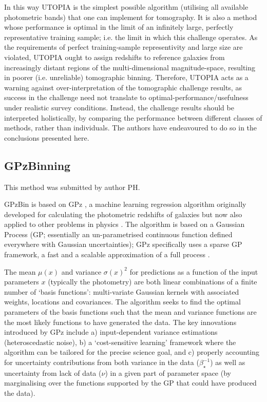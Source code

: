 \documentclass[twocolumn,twocolappendix]{aastex63}
\begin{document}
In this way \textsc{UTOPIA} is the simplest possible algorithm (utilising all available
photometric bands) that one can  implement for tomography. It is also a method
whose performance is optimal in the limit of an infinitely large,  perfectly
representative training sample; i.e. the limit in which this challenge operates.
As the requirements of perfect  training-sample representivity and large size
are violated, \textsc{UTOPIA} ought to assign redshifts to reference  galaxies from
increasingly distant regions of the multi-dimensional magnitude-space, resulting
in poorer (i.e. unreliable) tomographic binning.  Therefore, \textsc{UTOPIA} acts as a warning against
over-interpretation of the tomographic challenge results, as success in the
challenge  need not translate to optimal-performance/usefulness under realistic
survey conditions. Instead, the challenge results should be interpreted
holistically, by comparing the performance between different classes of methods,
rather than individuals. The authors have endeavoured to do so in the conclusions presented here.


\subsection{ {\sc GPzBinning} }
This method was submitted by author PH.

GPzBin is based on GPz \citep{Almosallam2016a,Almosallam2016b}, a machine learning
regression algorithm originally developed for calculating the photometric
redshifts of galaxies \citep{Gomes2017,Duncan2018,Hatfield2020} but now also
applied to other problems in physics \citep{Peng2019,Hatfield2020}. The
algorithm is based on a Gaussian Process (GP; essentially an un-parametrised continuous
function defined everywhere with Gaussian uncertainties); GPz specifically uses 
a sparse GP framework, a fast and a scalable approximation
of a full process \citep{Rasmussen2006}.

The mean $\mu(x)$ and variance $\sigma(x)^2$ for predictions as a function of
the input parameters $x$ (typically the photometry) are both linear combinations
of a finite number of `basis functions': multi-variate Gaussian kernels with
associated weights, locations and covariances. The algorithm seeks to find the
optimal parameters of the basis functions such that the mean and variance
functions are the most likely functions to have generated the data. The key
innovations introduced by GPz include a) input-dependent variance estimations
(heteroscedastic noise), b) a `cost-sensitive learning' framework where the
algorithm can be tailored for the precise science goal, and c) properly
accounting for uncertainty contributions from both variance in the data
($\beta^{-1}_{\star}$) as well as uncertainty from lack of data ($\nu$) in a
given part of parameter space (by marginalising over the functions supported by
the GP that could have produced the data).
\end{document}
